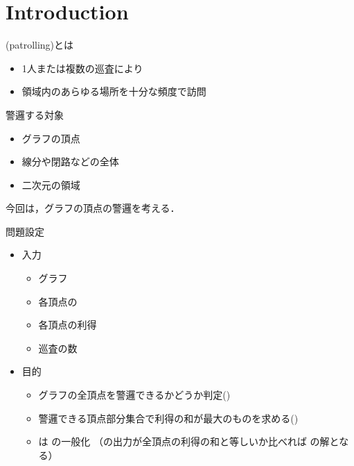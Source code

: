 
\section{Introduction}




\begin{frame}
(patrolling)とは
\begin{itemize}
	\item 1人または複数の巡査により
	\item 領域内のあらゆる場所を十分な頻度で訪問
\end{itemize}
警邏する対象
\begin{itemize}
	\item グラフの頂点
	\item 線分や閉路などの全体
	\item 二次元の領域
\end{itemize}
今回は，グラフの頂点の警邏を考える．
\end{frame}




\begin{frame}{問題設定}
\begin{itemize}
	\item 入力
	\begin{itemize}
		\item グラフ
		\item 各頂点の{\alert {\timelimit} }
		\item 各頂点の利得
		\item 巡査の数
	\end{itemize}
	\item 目的
	\begin{itemize}
		\item グラフの全頂点を警邏できるかどうか判定(\decisionpp)
		\item 警邏できる頂点部分集合で利得の和が最大のものを求める(\optpp)
		\item \optpp は \decisionpp の一般化
		（\optpp の出力が全頂点の利得の和と等しいか比べれば
		\decisionpp の解となる）
	\end{itemize}
\end{itemize}
\end{frame}





